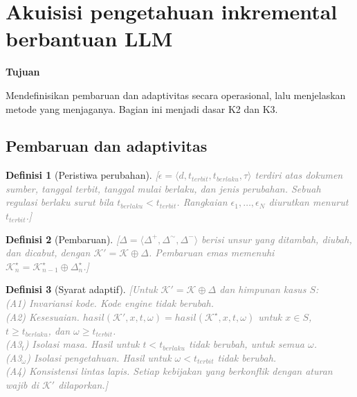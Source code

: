 \documentclass[journal,a4paper]{IEEEtran}
\newcommand{\en}[1]{\textit{#1}}
\newtheorem{definisi}{Definisi}
\newcommand{\K}{\mathcal{K}}
\newcommand{\hasil}{\mathit{hasil}}
\newcommand{\emas}{\star}
\newif\ifrancangan \rancangantrue
\newcommand{\kotak}[3]{\ifrancangan\par\begingroup\scriptsize
  \def\FrameCommand{\fboxsep=3pt\fboxrule=0.4pt\fcolorbox{#1!60!black}{#1!6}}%
  \MakeFramed{\advance\hsize-\width\FrameRestore}\noindent\textbf{#2}\par #3\endMakeFramed\endgroup\fi}
\newcommand{\tujuan}[1]{\kotak{blue}{Tujuan}{#1}}
\newcommand{\isian}[1]{\ifrancangan\textcolor{gray}{[#1]}\fi}
\begin{document}
\section{Akuisisi pengetahuan inkremental berbantuan LLM}
\label{sec:akuisisi}
\tujuan{Mendefinisikan pembaruan dan adaptivitas secara operasional, lalu menjelaskan metode yang menjaganya. Bagian ini menjadi dasar K2 dan K3.}

\subsection{Pembaruan dan adaptivitas}
\label{subsec:adaptif}

\begin{definisi}[Peristiwa perubahan]
\label{def:peristiwa}
\isian{$\epsilon = \langle d, t_{\mathit{terbit}}, t_{\mathit{berlaku}}, \tau \rangle$ terdiri atas dokumen sumber, tanggal terbit, tanggal mulai berlaku, dan jenis perubahan. Sebuah regulasi berlaku surut bila $t_{\mathit{berlaku}} < t_{\mathit{terbit}}$. Rangkaian $\epsilon_1, \dots, \epsilon_N$ diurutkan menurut $t_{\mathit{terbit}}$.}
\end{definisi}

\begin{definisi}[Pembaruan]
\label{def:pembaruan}
\isian{$\Delta = \langle \Delta^{+}, \Delta^{\sim}, \Delta^{-} \rangle$ berisi unsur yang ditambah, diubah, dan dicabut, dengan $\K' = \K \oplus \Delta$. Pembaruan emas memenuhi $\K^{\emas}_n = \K^{\emas}_{n-1} \oplus \Delta^{\emas}_n$.}
\end{definisi}

\begin{definisi}[Syarat adaptif]
\label{def:syarat}
\isian{Untuk $\K' = \K \oplus \Delta$ dan himpunan kasus $S$:\\
(A1) Invariansi kode. Kode \en{engine} tidak berubah.\\
(A2) Kesesuaian. $\hasil(\K', x, t, \omega) = \hasil(\K^{\emas}, x, t, \omega)$ untuk $x \in S$, $t \geq t_{\mathit{berlaku}}$, dan $\omega \geq t_{\mathit{terbit}}$.\\
(A3$_t$) Isolasi masa. Hasil untuk $t < t_{\mathit{berlaku}}$ tidak berubah, untuk semua $\omega$.\\
(A3$_\omega$) Isolasi pengetahuan. Hasil untuk $\omega < t_{\mathit{terbit}}$ tidak berubah.\\
(A4) Konsistensi lintas lapis. Setiap kebijakan yang berkonflik dengan aturan wajib di $\K'$ dilaporkan.}
\end{definisi}
\end{document}

